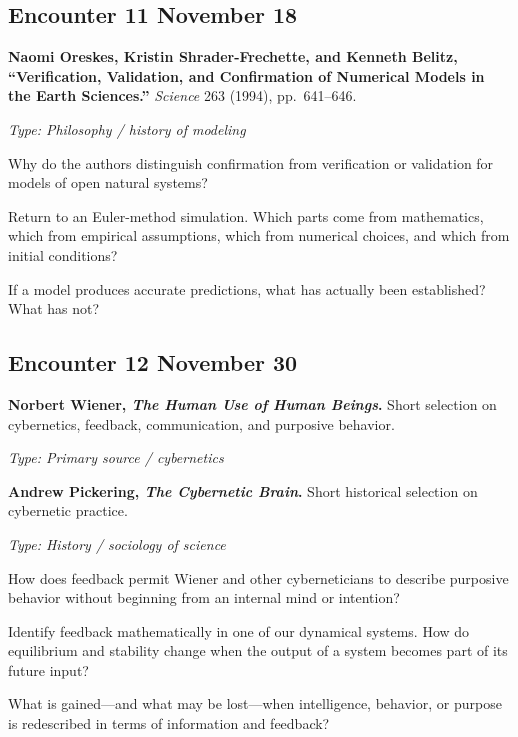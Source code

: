 \subsection*{Encounter 11 \hfill November 18}

\textbf{Naomi Oreskes, Kristin Shrader-Frechette, and Kenneth Belitz,
``Verification, Validation, and Confirmation of Numerical Models in the Earth
Sciences.''}
\emph{Science} 263 (1994), pp.~641--646.

\textit{Type: Philosophy / history of modeling}

\begin{description}[leftmargin=1.15in,style=nextline]
\item[\textcolor{LangRed}{READ}]
Why do the authors distinguish confirmation from verification or validation for
models of open natural systems?
\item[\textcolor{LangRed}{CONNECT}]
Return to an Euler-method simulation. Which parts come from mathematics, which
from empirical assumptions, which from numerical choices, and which from
initial conditions?
\item[\textcolor{LangRed}{QUESTION}]
If a model produces accurate predictions, what has actually been established?
What has not?
\end{description}

\subsection*{Encounter 12 \hfill November 30}

\textbf{Norbert Wiener, \emph{The Human Use of Human Beings}.}
Short selection on cybernetics, feedback, communication, and purposive behavior.
\parencite{wiener1950}

\textit{Type: Primary source / cybernetics}

\medskip

\textbf{Andrew Pickering, \emph{The Cybernetic Brain}.}
Short historical selection on cybernetic practice.

\textit{Type: History / sociology of science}

\begin{description}[leftmargin=1.15in,style=nextline]
\item[\textcolor{LangRed}{READ}]
How does feedback permit Wiener and other cyberneticians to describe purposive
behavior without beginning from an internal mind or intention?
\item[\textcolor{LangRed}{CONNECT}]
Identify feedback mathematically in one of our dynamical systems. How do
equilibrium and stability change when the output of a system becomes part of
its future input?
\item[\textcolor{LangRed}{QUESTION}]
What is gained---and what may be lost---when intelligence, behavior, or purpose
is redescribed in terms of information and feedback?
\end{description}

